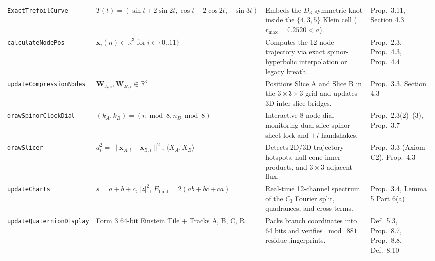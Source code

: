 \documentclass[11pt, a4paper]{article}
\begin{document}
\begin{longtable}{@{}p{3.6cm}p{3.8cm}p{4.2cm}p{3.4cm}@{}}
\addlinespace
\texttt{ExactTrefoilCurve} & $T(t) = (\sin t + 2\sin 2t, \cos t - 2\cos 2t, -\sin 3t)$ & Embeds the $D_3$-symmetric knot inside the $\{4,3,5\}$ Klein cell ($r_{\max} = 0.2520 < a$). & Prop.~3.11, Section 4.3 \\
\addlinespace
\texttt{calculateNodePos} & $\mathbf{x}_i(n) \in \mathbb{R}^3$ for $i \in \{0..11\}$ & Computes the 12-node trajectory via exact spinor-hyperbolic interpolation or legacy breath. & Prop.~2.3, Prop.~4.3, Prop.~4.4 \\
\addlinespace
\texttt{updateCompressionNodes} & $\mathbf{W}_{A,i}, \mathbf{W}_{B,i} \in \mathbb{R}^3$ & Positions Slice A and Slice B in the $3\times 3\times 3$ grid and updates 3D inter-slice bridges. & Prop.~3.3, Section 4.3 \\
\addlinespace
\texttt{drawSpinorClockDial} & $(k_A, k_B) = (n \bmod 8, n_B \bmod 8)$ & Interactive 8-node dial monitoring dual-slice spinor sheet lock and $\pm i$ handshakes. & Prop.~2.3(2)--(3), Prop.~3.7 \\
\addlinespace
\texttt{drawSlicer} & $d_i^2 = \|\mathbf{x}_{A,i} - \mathbf{x}_{B,i}\|^2$, $\langle X_A, X_B\rangle$ & Detects 2D/3D trajectory hotspots, null-cone inner products, and $3\times 3$ adjacent flux. & Prop.~3.3 (Axiom C2), Prop.~4.3 \\
\addlinespace
\texttt{updateCharts} & $s = a+b+c$, $|z|^2$, $E_{\text{bind}} = 2(ab+bc+ca)$ & Real-time 12-channel spectrum of the $C_3$ Fourier split, quadrances, and cross-terms. & Prop.~3.4, Lemma 5 Part 6(a) \\
\addlinespace
\texttt{updateQuaternionDisplay} & Form 3 64-bit Einstein Tile + Tracks A, B, C, R & Packs branch coordinates into 64 bits and verifies $\bmod\ 881$ residue fingerprints. & Def.~5.3, Prop.~8.7, Prop.~8.8, Def.~8.10 \\
\end{longtable}
\end{document}
